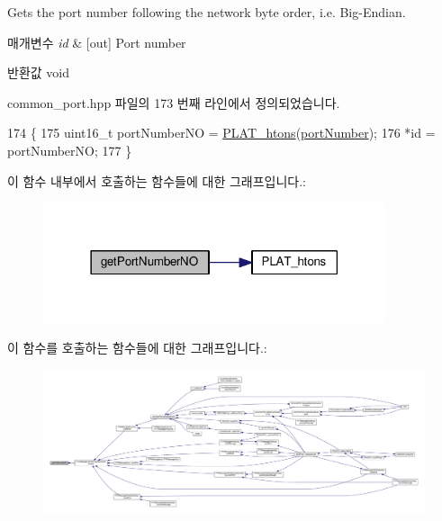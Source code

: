 Gets the port number following the network byte order, i.\+e. Big-\/\+Endian. 


\begin{DoxyParams}{매개변수}
{\em id} & \mbox{[}out\mbox{]} Port number \\
\hline
\end{DoxyParams}
\begin{DoxyReturn}{반환값}
void 
\end{DoxyReturn}


common\+\_\+port.\+hpp 파일의 173 번째 라인에서 정의되었습니다.


\begin{DoxyCode}
174     \{
175         uint16\_t portNumberNO = \hyperlink{linux_2src_2platform_8cpp_aa89fc0aa7465274c200da69771d2a043}{PLAT\_htons}(\hyperlink{class_port_identity_ad323c105cae25089c0f53e4fec04c080}{portNumber});
176         *\textcolor{keywordtype}{id} = portNumberNO;
177     \}
\end{DoxyCode}


이 함수 내부에서 호출하는 함수들에 대한 그래프입니다.\+:
\nopagebreak
\begin{figure}[H]
\begin{center}
\leavevmode
\includegraphics[width=285pt]{class_port_identity_ae22242effe1001dc666522e6019fd494_cgraph}
\end{center}
\end{figure}




이 함수를 호출하는 함수들에 대한 그래프입니다.\+:
\nopagebreak
\begin{figure}[H]
\begin{center}
\leavevmode
\includegraphics[width=350pt]{class_port_identity_ae22242effe1001dc666522e6019fd494_icgraph}
\end{center}
\end{figure}


